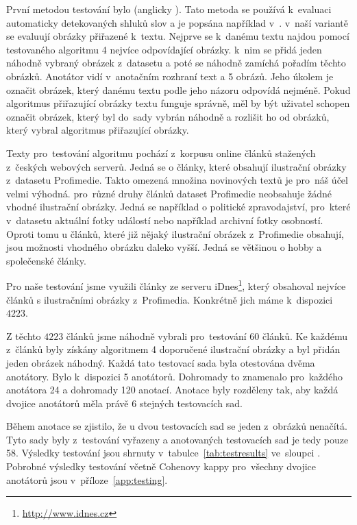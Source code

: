 První metodou testování bylo  (anglicky ). Tato metoda se používá k~evaluaci automaticky detekovaných shluků slov a je popsána například v~\cite{chang}. v~naší variantě se evaluují obrázky přiřazené k~textu. Nejprve se k~danému textu najdou pomocí testovaného algoritmu 4 nejvíce odpovídající obrázky. k~nim se přidá jeden náhodně vybraný obrázek z~datasetu a poté se náhodně zamíchá pořadím těchto obrázků. Anotátor vidí v~anotačním rozhraní text a 5 obrázů. Jeho úkolem je označit obrázek, který danému textu podle jeho názoru odpovídá nejméně. Pokud algoritmus přiřazující obrázky textu funguje správně, měl by být uživatel schopen označit obrázek, který byl do~sady vybrán náhodně a rozlišit ho od obrázků, který vybral algoritmus přiřazující obrázky.

Texty pro~testování algoritmu pochází z~korpusu online článků stažených z~českých webových serverů. Jedná se o články, které obsahují ilustrační obrázky z~datasetu Profimedie. Takto omezená množina novinových textů je pro~náš účel velmi výhodná. pro~různé druhy článků dataset Profimedie neobsahuje žádné vhodné ilustrační obrázky. Jedná se například o politické zpravodajství, pro~které v~datasetu aktuální fotky událostí nebo například archivní fotky osobností. Oproti tomu u článků, které již nějaký ilustrační obrázek z~Profimedie obsahují, jsou možnosti vhodného obrázku daleko vyšší. Jedná se většinou o hobby a společenské články.

Pro naše testování jsme využili články ze serveru iDnes\footnote{\url{http://www.idnes.cz}}, který obsahoval nejvíce článků s ilustračními obrázky z~Profimedia. Konkrétně jich máme k~dispozici $4223$.

Z těchto $4 223$ článků jsme náhodně vybrali pro~testování 60 článků. Ke každému z~článků byly získány algoritmem 4 doporučené ilustrační obrázky a byl přidán jeden obrázek náhodný. Každá tato testovací sada byla otestována dvěma anotátory. Bylo k~dispozici 5 anotátorů. Dohromady to znamenalo pro~každého anotátora 24 a dohromady 120 anotací. Anotace byly rozděleny tak, aby každá dvojice anotátorů měla právě 6 stejných testovacích sad.

Během anotace se zjistilo, že u dvou testovacích sad se jeden z~obrázků nenačítá. Tyto sady byly z~testování vyřazeny a anotovaných testovacích sad je tedy pouze 58. Výsledky testování jsou shrnuty v~tabulce~\ref{tab:testresults} ve~sloupci . Pobrobné výsledky testování včetně Cohenovy kappy pro~všechny dvojice anotátorů jsou v~příloze~\ref{app:testing}.

